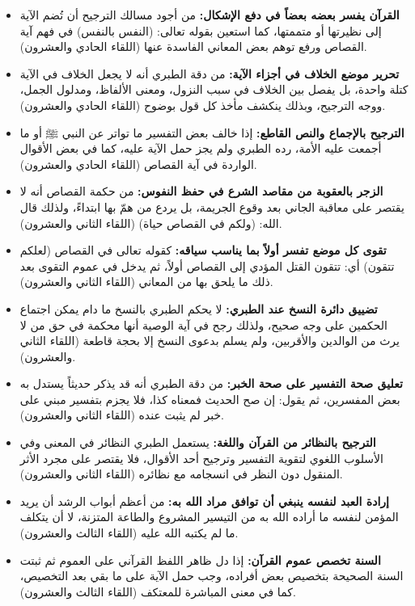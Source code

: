 \begin{itemize}
    \item \textbf{القرآن يفسر بعضه بعضاً في دفع الإشكال:} من أجود مسالك الترجيح أن تُضم الآية إلى نظيرتها أو متممتها، كما استعين بقوله تعالى: (النفس بالنفس) في فهم آية القصاص ورفع توهم بعض المعاني الفاسدة عنها (اللقاء الحادي والعشرون).
    \item \textbf{تحرير موضع الخلاف في أجزاء الآية:} من دقة الطبري أنه لا يجعل الخلاف في الآية كتلة واحدة، بل يفصل بين الخلاف في سبب النزول، ومعنى الألفاظ، ومدلول الجمل، ووجه الترجيح، وبذلك ينكشف مأخذ كل قول بوضوح (اللقاء الحادي والعشرون).
    \item \textbf{الترجيح بالإجماع والنص القاطع:} إذا خالف بعض التفسير ما تواتر عن النبي ﷺ أو ما أجمعت عليه الأمة، رده الطبري ولم يجز حمل الآية عليه، كما في بعض الأقوال الواردة في آية القصاص (اللقاء الحادي والعشرون).
    \item \textbf{الزجر بالعقوبة من مقاصد الشرع في حفظ النفوس:} من حكمة القصاص أنه لا يقتصر على معاقبة الجاني بعد وقوع الجريمة، بل يردع من همّ بها ابتداءً، ولذلك قال الله: (ولكم في القصاص حياة) (اللقاء الثاني والعشرون).
    \item \textbf{تقوى كل موضع تفسر أولاً بما يناسب سياقه:} كقوله تعالى في القصاص (لعلكم تتقون) أي: تتقون القتل المؤدي إلى القصاص أولاً، ثم يدخل في عموم التقوى بعد ذلك ما يلحق بها من المعاني (اللقاء الثاني والعشرون).
    \item \textbf{تضييق دائرة النسخ عند الطبري:} لا يحكم الطبري بالنسخ ما دام يمكن اجتماع الحكمين على وجه صحيح، ولذلك رجح في آية الوصية أنها محكمة في حق من لا يرث من الوالدين والأقربين، ولم يسلم بدعوى النسخ إلا بحجة قاطعة (اللقاء الثاني والعشرون).
    \item \textbf{تعليق صحة التفسير على صحة الخبر:} من دقة الطبري أنه قد يذكر حديثاً يستدل به بعض المفسرين، ثم يقول: إن صح الحديث فمعناه كذا، فلا يجزم بتفسير مبني على خبر لم يثبت عنده (اللقاء الثاني والعشرون).
    \item \textbf{الترجيح بالنظائر من القرآن واللغة:} يستعمل الطبري النظائر في المعنى وفي الأسلوب اللغوي لتقوية التفسير وترجيح أحد الأقوال، فلا يقتصر على مجرد الأثر المنقول دون النظر في انسجامه مع نظائره (اللقاء الثاني والعشرون).
    \item \textbf{إرادة العبد لنفسه ينبغي أن توافق مراد الله به:} من أعظم أبواب الرشد أن يريد المؤمن لنفسه ما أراده الله به من التيسير المشروع والطاعة المتزنة، لا أن يتكلف ما لم يكتبه الله عليه (اللقاء الثالث والعشرون).
    \item \textbf{السنة تخصص عموم القرآن:} إذا دل ظاهر اللفظ القرآني على العموم ثم ثبتت السنة الصحيحة بتخصيص بعض أفراده، وجب حمل الآية على ما بقي بعد التخصيص، كما في معنى المباشرة للمعتكف (اللقاء الثالث والعشرون).

\end{itemize}
